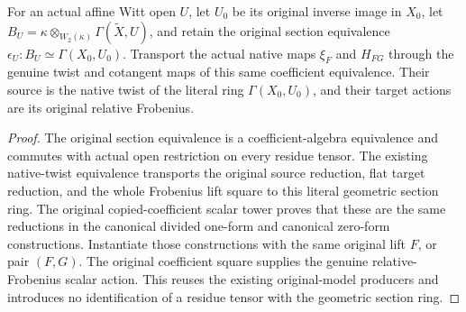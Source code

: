 \begin{definition}
\label{def:actual-witt-residue-native-xi-transport}
\leanok
For an actual affine Witt open $U$, let $U_0$ be its original inverse image in $X_0$, let $B_U=\kappa\otimes_{W_2(\kappa)}\Gamma(\widetilde X,U)$, and retain the original section equivalence $\epsilon_U:B_U\simeq\Gamma(X_0,U_0)$. Transport the actual native maps $\xi_F$ and $H_{FG}$ through the genuine twist and cotangent maps of this same coefficient equivalence. Their source is the native twist of the literal ring $\Gamma(X_0,U_0)$, and their target actions are its original relative Frobenius.
\end{definition}
\begin{proof}
The original section equivalence is a coefficient-algebra equivalence and commutes with actual open restriction on every residue tensor. The existing native-twist equivalence transports the original source reduction, flat target reduction, and the whole Frobenius lift square to this literal geometric section ring. The original copied-coefficient scalar tower proves that these are the same reductions in the canonical divided one-form and canonical zero-form constructions. Instantiate those constructions with the same original lift $F$, or pair $(F,G)$. The original coefficient square supplies the genuine relative-Frobenius scalar action. This reuses the existing original-model producers and introduces no identification of a residue tensor with the geometric section ring.
\end{proof}

